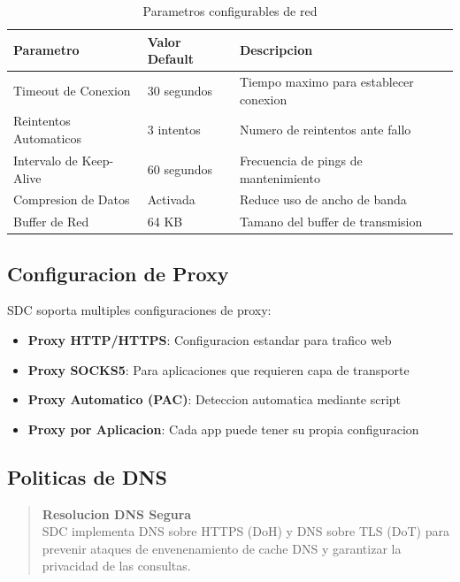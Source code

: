 \begin{table}[H]
\centering
\begin{tabular}{p{4.5cm}p{3cm}p{5.5cm}}
\toprule
\textbf{Parametro} & \textbf{Valor Default} & \textbf{Descripcion} \\
\midrule
Timeout de Conexion & 30 segundos & Tiempo maximo para establecer conexion \\
\midrule
Reintentos Automaticos & 3 intentos & Numero de reintentos ante fallo \\
\midrule
Intervalo de Keep-Alive & 60 segundos & Frecuencia de pings de mantenimiento \\
\midrule
Compresion de Datos & Activada & Reduce uso de ancho de banda \\
\midrule
Buffer de Red & 64 KB & Tamano del buffer de transmision \\
\bottomrule
\end{tabular}
\caption{Parametros configurables de red}
\label{tab:config-red}
\end{table}

\subsection{Configuracion de Proxy}

SDC soporta multiples configuraciones de proxy:

\begin{itemize}[leftmargin=*]
    \item \textbf{Proxy HTTP/HTTPS}: Configuracion estandar para trafico web
    \item \textbf{Proxy SOCKS5}: Para aplicaciones que requieren capa de transporte
    \item \textbf{Proxy Automatico (PAC)}: Deteccion automatica mediante script
    \item \textbf{Proxy por Aplicacion}: Cada app puede tener su propia configuracion
\end{itemize}

\subsection{Politicas de DNS}

\begin{quote}
\textbf{Resolucion DNS Segura}\\
SDC implementa DNS sobre HTTPS (DoH) y DNS sobre TLS (DoT) para prevenir ataques de envenenamiento de cache DNS y garantizar la privacidad de las consultas.
\end{quote}

